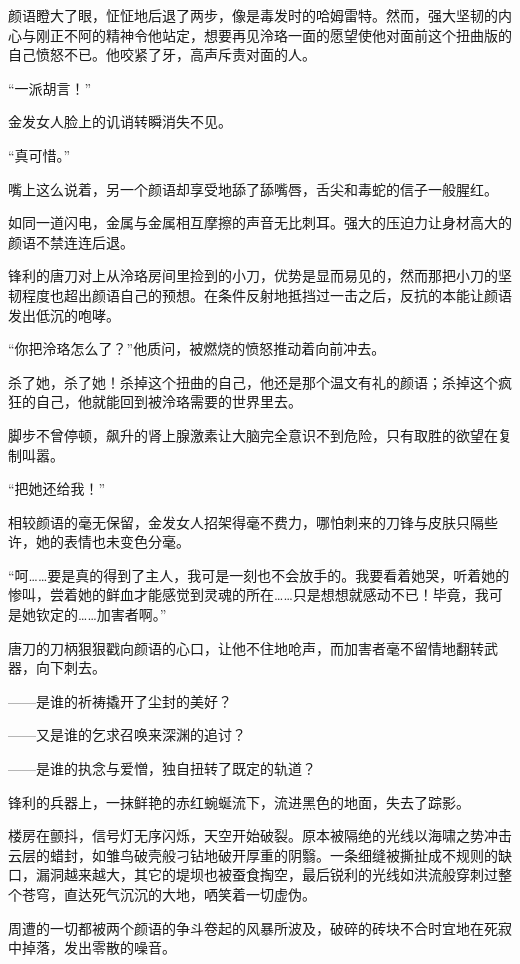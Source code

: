 \documentclass[UTF8, scheme = chinese, openany]{ctexbook}
\begin{document}
颜语瞪大了眼，怔怔地后退了两步，像是毒发时的哈姆雷特。然而，强大坚韧的内心与刚正不阿的精神令他站定，想要再见泠珞一面的愿望使他对面前这个扭曲版的自己愤怒不已。他咬紧了牙，高声斥责对面的人。

“一派胡言！”

金发女人脸上的讥诮转瞬消失不见。

“真可惜。”

嘴上这么说着，另一个颜语却享受地舔了舔嘴唇，舌尖和毒蛇的信子一般腥红。

如同一道闪电，金属与金属相互摩擦的声音无比刺耳。强大的压迫力让身材高大的颜语不禁连连后退。

锋利的唐刀对上从泠珞房间里捡到的小刀，优势是显而易见的，然而那把小刀的坚韧程度也超出颜语自己的预想。在条件反射地抵挡过一击之后，反抗的本能让颜语发出低沉的咆哮。

“你把泠珞怎么了？”他质问，被燃烧的愤怒推动着向前冲去。

杀了她，杀了她！杀掉这个扭曲的自己，他还是那个温文有礼的颜语；杀掉这个疯狂的自己，他就能回到被泠珞需要的世界里去。

脚步不曾停顿，飙升的肾上腺激素让大脑完全意识不到危险，只有取胜的欲望在复制叫嚣。

“把她还给我！”

相较颜语的毫无保留，金发女人招架得毫不费力，哪怕刺来的刀锋与皮肤只隔些许，她的表情也未变色分毫。

“呵……要是真的得到了主人，我可是一刻也不会放手的。我要看着她哭，听着她的惨叫，尝着她的鲜血才能感觉到灵魂的所在……只是想想就感动不已！毕竟，我可是她钦定的……加害者啊。”

唐刀的刀柄狠狠戳向颜语的心口，让他不住地呛声，而加害者毫不留情地翻转武器，向下刺去。

\vspace{1.5em}

——是谁的祈祷撬开了尘封的美好？

——又是谁的乞求召唤来深渊的追讨？

——是谁的执念与爱憎，独自扭转了既定的轨道？

锋利的兵器上，一抹鲜艳的赤红蜿蜒流下，流进黑色的地面，失去了踪影。

楼房在颤抖，信号灯无序闪烁，天空开始破裂。原本被隔绝的光线以海啸之势冲击云层的蜡封，如雏鸟破壳般刁钻地破开厚重的阴翳。一条细缝被撕扯成不规则的缺口，漏洞越来越大，其它的堤坝也被蚕食掏空，最后锐利的光线如洪流般穿刺过整个苍穹，直达死气沉沉的大地，哂笑着一切虚伪。

周遭的一切都被两个颜语的争斗卷起的风暴所波及，破碎的砖块不合时宜地在死寂中掉落，发出零散的噪音。
\end{document}
